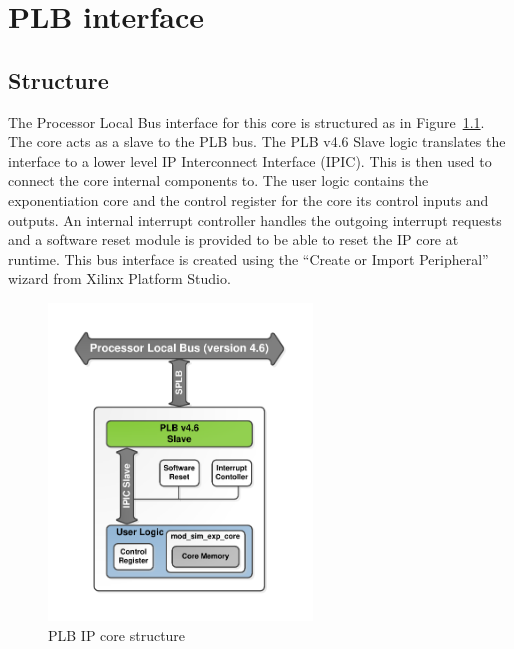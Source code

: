 \chapter{PLB interface}
\section{Structure}
The Processor Local Bus interface for this core is structured as in Figure~\ref{PLBstructure}. The core acts as a slave
to the PLB bus. The PLB v4.6 Slave\cite{XilinxPLB} logic translates the interface to a lower level IP Interconnect
Interface (IPIC).
This is then used to connect the core internal components to. The user logic contains the exponentiation core and the
control register for the core its control inputs and outputs. An internal interrupt controller\cite{XilinxIntr} handles
the outgoing interrupt requests and a software reset module is provided to be able to reset the IP core at runtime. This
bus interface is created using the ``Create or Import Peripheral'' wizard from Xilinx Platform Studio.\\
\begin{figure}[H]	
\centering
\includegraphics[trim=1.2cm 1.2cm 1.2cm 1.2cm, width=7cm]{pictures/plb_interface.pdf}
\caption{PLB IP core structure}
\label{PLBstructure}
\end{figure}

\newpage
